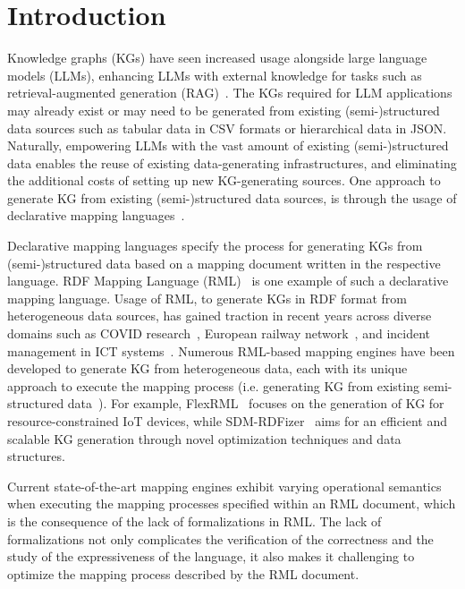 \section{Introduction}%
\label{sec:introduction}
Knowledge graphs (KGs) have seen increased usage alongside large language
models (LLMs), enhancing LLMs with external knowledge for tasks such as
retrieval-augmented generation (RAG)~\cite{Xu2024RAGKGLinkedin}. 
The KGs required for LLM applications may already exist or may need to be
generated from existing (semi-)structured data sources such as 
tabular data in CSV formats or hierarchical data in JSON.
Naturally, empowering LLMs with the vast amount of existing (semi-)structured
data enables the reuse of existing data-generating infrastructures, 
and eliminating the additional costs of setting up new KG-generating sources.
One approach to generate KG from existing (semi-)structured data sources, is
through the usage of declarative mapping
languages~\cite{VanAssche2022DeclarativeRDFgraph}.

Declarative mapping languages specify the process for generating KGs from
(semi-)structured data based on a mapping document written in the respective
language. 
RDF Mapping Language (RML)~\cite{dimou_ldow_2014} is one example of
such a declarative mapping language.
Usage of RML, to generate KGs in RDF format from heterogeneous data sources,
has gained traction in recent years across diverse domains such as COVID
research~\cite{Sakor2023KG4Covid}, European railway network~\citeneeded, and
incident management in ICT systems~\cite{Tailhardat2024NORIA}. 
Numerous RML-based mapping engines have been developed to generate KG from 
heterogeneous data, each with its unique approach to execute the mapping process
(i.e. generating KG from existing semi-structured data~\cite{VanAssche2022DeclarativeRDFgraph}). 
For example, FlexRML~\cite{Freund2024FlexRML} focuses on the generation of KG for 
resource-constrained IoT devices, while SDM-RDFizer~\cite{Iglesias2022ScalingKnowledgeGraph} 
aims for an efficient and scalable KG generation through novel 
optimization techniques and data structures. 

Current state-of-the-art mapping engines exhibit varying operational semantics
when executing the mapping processes specified within an RML document, 
which is the consequence of the lack of formalizations in RML. 
The lack of formalizations not only complicates the verification
of the correctness and the study of the expressiveness of the language, it also
makes it challenging to optimize the mapping process described by the RML
document.

